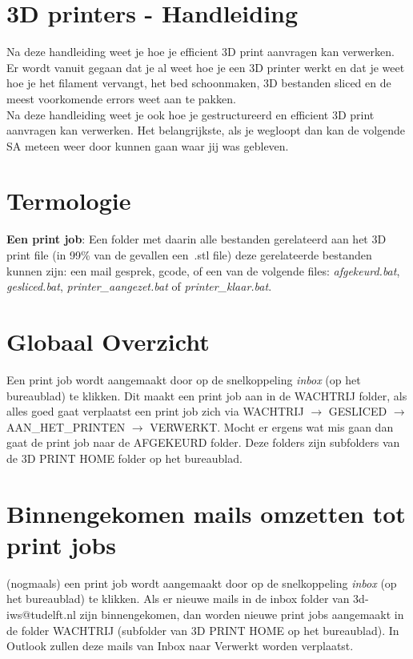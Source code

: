 \documentclass{article}
\begin{document}
\pagestyle{empty}
\large

\section*{\centering\hspace{-1cm}3D printers - Handleiding}
Na deze handleiding weet je hoe je efficient 3D print aanvragen kan verwerken. Er wordt vanuit gegaan dat je al weet hoe je een 3D printer werkt en dat je weet hoe je het filament vervangt, het bed schoonmaken, 3D bestanden sliced en de meest voorkomende errors weet aan te pakken.\\

Na deze handleiding weet je ook hoe je gestructureerd en efficient 3D print aanvragen kan verwerken. Het belangrijkste, als je wegloopt dan kan de volgende SA meteen weer door kunnen gaan waar jij was gebleven.

\section*{Termologie}
\noindent\textbf{Een print job}: Een folder met daarin alle bestanden gerelateerd aan het 3D print file (in 99\% van de gevallen een~.stl file) deze gerelateerde bestanden kunnen zijn: een mail gesprek, gcode, of een van de volgende files: \textit{afgekeurd.bat}, \textit{gesliced.bat}, \textit{printer\_aangezet.bat} of \textit{printer\_klaar.bat}.

\section*{Globaal Overzicht}
\begin{center}
\scalebox{0.7}{
  
}
\end{center}
Een print job wordt aangemaakt door op de snelkoppeling \textit{inbox} (op het bureaublad) te klikken. Dit maakt een print job aan in de WACHTRIJ folder, als alles goed gaat verplaatst een print job zich via WACHTRIJ $\rightarrow$ GESLICED $\rightarrow$ AAN\_HET\_PRINTEN $\rightarrow$ VERWERKT. Mocht er ergens wat mis gaan dan gaat de print job naar de AFGEKEURD folder. Deze folders zijn subfolders van de 3D PRINT HOME folder op het bureaublad.

\section*{Binnengekomen mails omzetten tot print jobs}
(nogmaals) een print job wordt aangemaakt door op de snelkoppeling \textit{inbox} (op het bureaublad) te klikken. Als er nieuwe mails in de inbox folder van 3d-iws@tudelft.nl zijn binnengekomen, dan worden nieuwe print jobs aangemaakt in de folder WACHTRIJ (subfolder van 3D PRINT HOME op het bureaublad). In Outlook zullen deze mails van Inbox naar Verwerkt worden verplaatst.\\
\end{document}
